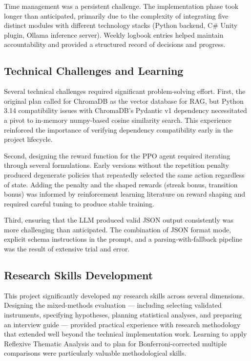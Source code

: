 \documentclass[12pt,a4paper]{report}
\begin{document}
Time management was a persistent challenge. The implementation phase took longer than anticipated, primarily due to the complexity of integrating five distinct modules with different technology stacks (Python backend, C\# Unity plugin, Ollama inference server). Weekly logbook entries helped maintain accountability and provided a structured record of decisions and progress.

\subsection{Technical Challenges and Learning}

Several technical challenges required significant problem-solving effort. First, the original plan called for ChromaDB as the vector database for RAG, but Python 3.14 compatibility issues with ChromaDB's Pydantic v1 dependency necessitated a pivot to in-memory numpy-based cosine similarity search. This experience reinforced the importance of verifying dependency compatibility early in the project lifecycle.

Second, designing the reward function for the PPO agent required iterating through several formulations. Early versions without the repetition penalty produced degenerate policies that repeatedly selected the same action regardless of state. Adding the penalty and the shaped rewards (streak bonus, transition bonus) was informed by reinforcement learning literature on reward shaping and required careful tuning to produce stable training.

Third, ensuring that the LLM produced valid JSON output consistently was more challenging than anticipated. The combination of JSON format mode, explicit schema instructions in the prompt, and a parsing-with-fallback pipeline was the result of extensive trial and error.

\subsection{Research Skills Development}

This project significantly developed my research skills across several dimensions. Designing the mixed-methods evaluation --- including selecting validated instruments, specifying hypotheses, planning statistical analyses, and preparing an interview guide --- provided practical experience with research methodology that extended well beyond the technical implementation work. Learning to apply Reflexive Thematic Analysis \citep{braun2022thematic} and to plan for Bonferroni-corrected multiple comparisons were particularly valuable methodological skills.
\end{document}
